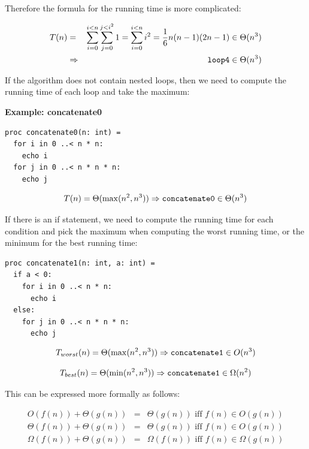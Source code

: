 \documentclass[justified, sixbynine]{tufte-book}
\def\subsubsection#1{{\bf #1}}
\theoremstyle{plain}%
\newtheorem * {corollary}{Corollary}
\theoremstyle{definition}
\theoremstyle{remark}
\newtheorem * {remark}{Remark}
\newtheorem * {note}{Note}
\begin{document}
\begin{fullwidth}
Therefore the formula for the running time is more complicated:

\begin{eqnarray}
T(n) &=&\sum_{i=0}^{i<n}\sum_{j=0}^{j<i^2}1=\sum_{i=0}^{i<n}i^2=\frac
16n(n-1)(2n-1)\in \Theta (n^3) \\
&\Rightarrow &\text{{\tt loop4}}\in \Theta (n^3)
\end{eqnarray}

If the algorithm does not contain nested loops, then we need to compute the running time of each loop and take the maximum:

\subsubsection{Example: concatenate0}
\begin{lstlisting}
proc concatenate0(n: int) =
  for i in 0 ..< n * n:
    echo i
  for j in 0 ..< n * n * n:
    echo j
\end{lstlisting}

\begin{equation}
T(n)=\Theta (\max (n^2, n^3))\Rightarrow \text{{\tt concatenate0}}\in \Theta
(n^3)
\end{equation}

If there is an if statement, we need to compute the running time for each condition and pick the maximum when computing the worst running time, or the minimum for the best running time:

\begin{lstlisting}
proc concatenate1(n: int, a: int) =
  if a < 0:
    for i in 0 ..< n * n:
      echo i
  else:
    for j in 0 ..< n * n * n:
      echo j
\end{lstlisting}

\begin{equation}
T_{worst}(n)=\Theta (\max (n^2, n^3))\Rightarrow \text{{\tt concatenate1}}\in O(n^3)
\end{equation}

\begin{equation}
T_{best}(n)=\Theta (\min (n^2, n^3))\Rightarrow \text{{\tt concatenate1}}\in \Omega(n^2)
\end{equation}

This can be expressed more formally as follows:

\begin{eqnarray}
O(f(n))+\Theta (g(n)) &=&\Theta (g(n))\text{ iff }f(n)\in O(g(n)) \\
\Theta (f(n))+\Theta (g(n)) &=&\Theta (g(n))\text{ iff }f(n)\in O(g(n)) \\
\Omega (f(n))+\Theta (g(n)) &=&\Omega (f(n))\text{ iff }f(n)\in \Omega (g(n))
\end{eqnarray}


\end{fullwidth}
\end{document}
